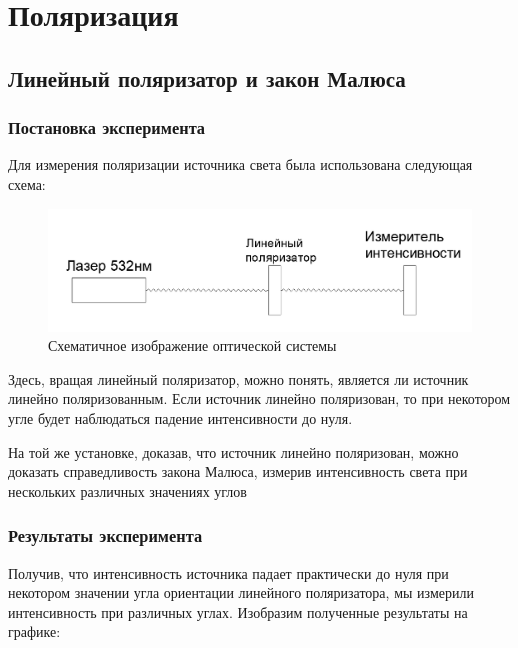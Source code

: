 \documentclass[a4paper,14pt]{extarticle}
\begin{document}
	\section{Поляризация}
		\subsection{Линейный поляризатор и закон Малюса}
			\subsubsection{Постановка эксперимента}
				Для измерения поляризации источника света была использована следующая схема:
				
					\begin{figure}[h!]
						\centering
						\includegraphics[width=1\linewidth]{Malus.png}
						\caption{Схематичное изображение оптической системы}
						\label{fig5}
					\end{figure}
				Здесь, вращая линейный поляризатор, можно понять, является ли источник линейно поляризованным. Если источник линейно поляризован, то при некотором угле будет наблюдаться падение интенсивности до нуля.
				
				На той же установке, доказав, что источник линейно поляризован, можно доказать справедливость закона Малюса, измерив интенсивность света при нескольких различных значениях углов
				
			\subsubsection{Результаты эксперимента}
				Получив, что интенсивность источника падает практически до нуля при некотором значении угла ориентации линейного поляризатора, мы измерили интенсивность при различных углах. Изобразим полученные результаты на графике:
				
\end{document}
